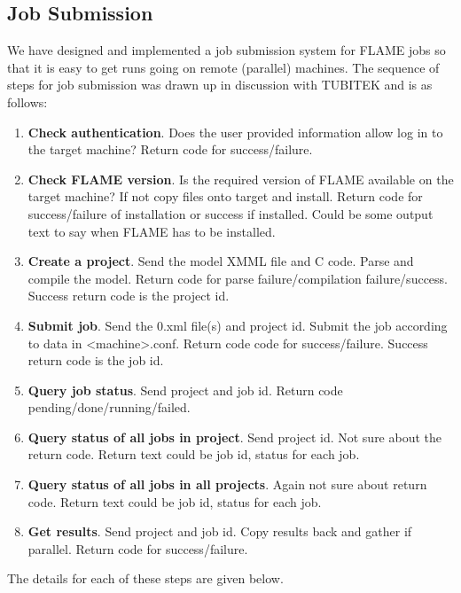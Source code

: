 \subsection{Job Submission}

We have designed and implemented a job submission system for FLAME jobs so that it is easy to get runs going on remote (parallel) machines. The sequence of steps for job submission was drawn up in discussion with TUBITEK and is as follows:

\begin{enumerate}
	\item \textbf{Check authentication}. Does the user provided information allow log in to the target machine? Return code for success/failure.
    \item \textbf{Check FLAME version}. Is the required version of FLAME available on the target machine? If not copy files onto target and install. Return code for success/failure of installation or success if installed. Could be some output text to say when FLAME has to be installed.
    \item \textbf{Create a project}. Send the model XMML file and C code. Parse and compile the model. Return code for parse failure/compilation failure/success. Success return code is the project id.
    \item \textbf{Submit job}. Send the 0.xml file(s) and project id. Submit the job according to data in <machine>.conf. Return code code for success/failure. Success return code is the job id.
    \item \textbf{Query job status}. Send project and job id. Return code pending/done/running/failed.
    \item \textbf{Query status of all jobs in project}. Send project id. Not sure about the return code. Return text could be {job id, status} for each job.
    \item \textbf{Query status of all jobs in all projects}. Again not sure about return code. Return text could be {job id, status} for each job.
    \item \textbf{Get results}. Send project and job id. Copy results back and gather if parallel. Return code for success/failure. 
\end{enumerate}

The details for each of these steps are given below.
